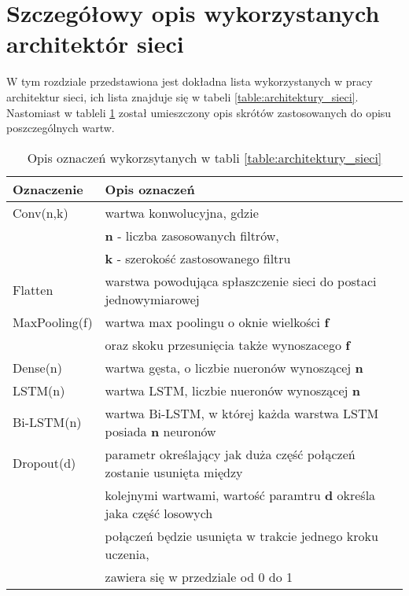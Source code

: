 \newpage %
\section{Szczegółowy opis wykorzystanych architektór sieci}

W tym rozdziale przedstawiona jest dokładna lista wykorzystanych w pracy architektur sieci, ich lista znajduje się w tabeli \ref{table:architektury_sieci}. Nastomiast w tableli \ref{tab:oznaczenia_warstw} został umieszczony opis skrótów zastosowanych do opisu poszczególnych wartw.



\begin{table}[!h]  \centering
    \caption{Opis oznaczeń wykorzsytanych w tabli \ref{table:architektury_sieci}}
    \label{tab:oznaczenia_warstw}
    \begin{tabular} {| l | l |} \hline
        Oznaczenie    & Opis oznaczeń                                                          \\ \hline
        Conv(n,k)     & wartwa konwolucyjna, gdzie                                             \\ & \textbf{n} - liczba zasosowanych filtrów, \\ & \textbf{k} - szerokość zastosowanego filtru \\ \hline
        Flatten       & warstwa powodująca spłaszczenie sieci do postaci jednowymiarowej       \\ \hline
        MaxPooling(f) & wartwa max poolingu o oknie wielkości \textbf{f}                                \\ & oraz skoku przesunięcia także wynoszacego \textbf{f}   \\ \hline
        Dense(n)      & wartwa gęsta, o liczbie nueronów wynoszącej \textbf{n}                 \\ \hline
        LSTM(n)       & wartwa LSTM, liczbie nueronów wynoszącej \textbf{n}                            \\ \hline
        Bi-LSTM(n)    & wartwa Bi-LSTM, w której każda warstwa LSTM posiada \textbf{n} neuronów         \\ \hline
        Dropout(d)    & parametr określający jak duża część połączeń zostanie  usunięta między \\ & kolejnymi wartwami, wartość paramtru \textbf{d} określa jaka część losowych \\ & połączeń będzie usunięta w trakcie jednego kroku uczenia, \\ & zawiera się w przedziale od 0 do 1                                                             \\ \hline
    \end{tabular}
\end{table}

